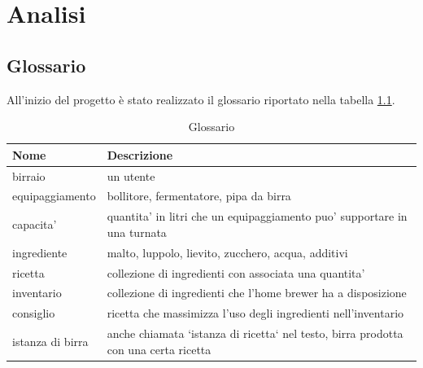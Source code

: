 \documentclass[a4paper,12pt]{report}
\begin{document}
\newpage
    \chapter{Analisi}
    	\section{Glossario}
	All'inizio del progetto è stato realizzato il glossario riportato nella tabella \ref{tab:Gloassario}.
    		\begin{table}[!h]
      			\renewcommand{\arraystretch}{1.2}
      			\begin{tabular}{p{}|p{}} 
        				\textbf{Nome}  & \textbf{Descrizione} \\
    				\hline
           			birraio & un utente \\
                        		equipaggiamento & bollitore, fermentatore, pipa da birra \\
                            	capacita' & quantita' in litri che un equipaggiamento puo' supportare in una turnata \\
                          	ingrediente & malto, luppolo, lievito, zucchero, acqua, additivi \\
                          	ricetta & collezione di ingredienti con associata una quantita' \\
                          	inventario & collezione di ingredienti che l'home brewer ha a disposizione \\
                            	consiglio & ricetta che massimizza l'uso degli ingredienti nell'inventario \\
                            	istanza di birra & anche chiamata `istanza di ricetta` nel testo, birra prodotta con una certa ricetta \\
        			\end{tabular}
        			\caption{Glossario}
      			\label{tab:Gloassario}
    		\end{table}
\newpage
\end{document}
